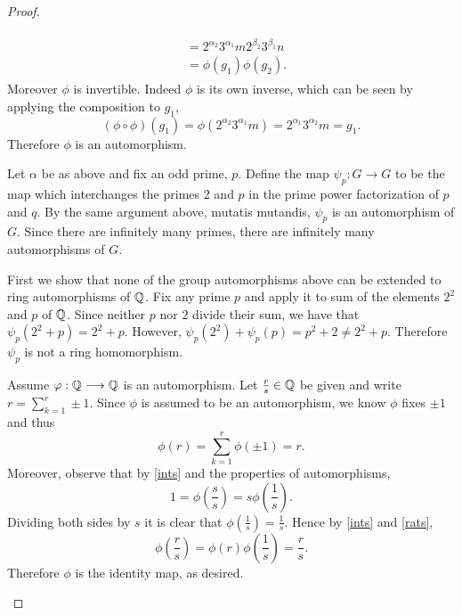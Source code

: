 \documentclass[10pt]{amsart}
\begin{document}
\begin{thm}
\begin{proof}
\begin{alphaenum}
\begin{align*}
\begin{split}
          & = 2^{\alpha_2}3^{\alpha_1}m2^{\beta_2}3^{\beta_1}n\\
          & = \phi(g_1)\phi(g_2).
        \end{split}
      \end{align*}
      Moreover $\phi$ is invertible.
      Indeed $\phi$ is its own inverse, which can be seen by applying the composition to $g_1$, $$(\phi \circ \phi)(g_1) = \phi(2^{\alpha_2}3^{\alpha_1}m) = 2^{\alpha_1}3^{\alpha_2}m = g_1.$$  
      Therefore $\phi$ is an automorphism.
    \item
      Let $\alpha$ be as above and fix an odd prime, $p$.  
      Define the map $\psi_p: G \longrightarrow G$ to be the map which interchanges the primes 2 and $p$ in the prime power factorization of $p$ and $q$.  
      By the same argument above, mutatis mutandis, $\psi_p$ is an automorphism of $G$.
      Since there are infinitely many primes, there are infinitely many automorphisms of $G$.
    \item
      First we show that none of the group automorphisms above can be extended to ring automorphisms of $\mathbb{Q}$.
      Fix any prime $p$ and apply it to sum of the elements $2^2$ and $p$ of $\mathbb{Q}$.
      Since neither $p$ nor $2$ divide their sum, we have that $\psi_p(2^2 + p) = 2^2 + p$.
      However, $\psi_p(2^2) + \psi_p(p) = p^2 + 2 \not = 2^2 + p$.
      Therefore $\psi_p$ is not a ring homomorphism.
      
      
      Assume $\varphi: \mathbb{Q} \longrightarrow \mathbb{Q}$ is an automorphism.
      Let $\frac{r}{s} \in \mathbb{Q}$ be given and write $r = \sum_{k=1}^r \pm 1$.
      Since $\phi$ is assumed to be an automorphism, we know $\phi$ fixes $\pm1$ and thus 
      \begin{equation}
        \label{ints}
        \phi(r) = \sum_{k=1}^r \phi(\pm1) = r.
      \end{equation}
      Moreover, observe that by \eqref{ints} and the properties of automorphisms, 
      \begin{equation}
        \label{rats}
        1 = \phi(\frac{s}{s}) = s\phi(\frac{1}{s}).
      \end{equation}
      Dividing both sides by $s$ it is clear that $\phi(\frac{1}{s}) = \frac{1}{s}.$ 
      Hence by \eqref{ints} and \eqref{rats}, $$\phi(\frac{r}{s}) = \phi(r)\phi(\frac{1}{s}) = \frac{r}{s}.$$
      Therefore $\phi$ is the identity map, as desired.
    \end{alphaenum}
  \end{proof}
\end{thm}
\end{document}
